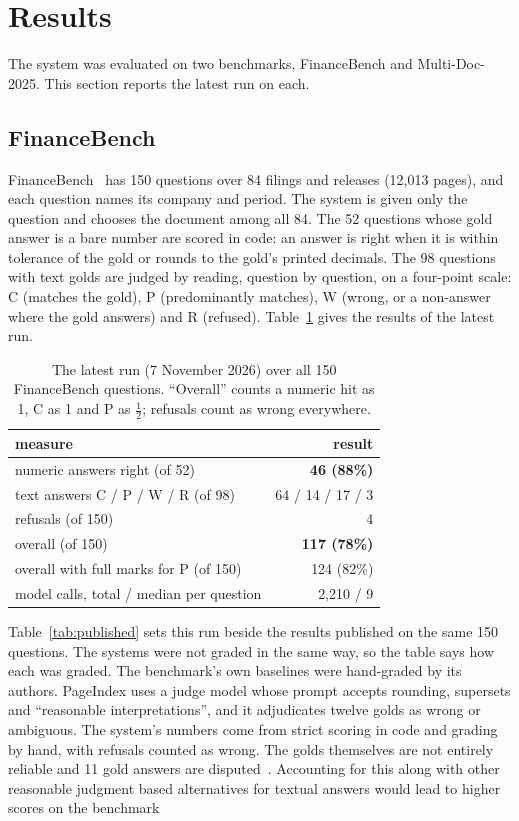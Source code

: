 \section{Results}
\label{sec:results}

The system was evaluated on two benchmarks, FinanceBench and Multi-Doc-2025. This section reports the latest run on each.

\subsection{FinanceBench}

FinanceBench~\citep{islam2023financebench} has 150 questions over 84 filings and releases (12,013 pages), and each question names its company and period. The system is given only the question and chooses the document among all 84. The 52 questions whose gold answer is a bare number are scored in code: an answer is right when it is within tolerance of the gold or rounds to the gold's printed decimals. The 98 questions with text golds are judged by reading, question by question, on a four-point scale: C (matches the gold), P (predominantly matches), W (wrong, or a non-answer where the gold answers) and R (refused). Table~\ref{tab:fb} gives the results of the latest run.

\begin{table}[h]
\centering\small
\caption{The latest run (7 November 2026) over all 150 FinanceBench questions. ``Overall'' counts a numeric hit as 1, C as 1 and P as $\tfrac12$; refusals count as wrong everywhere.}
\label{tab:fb}
\begin{tabular}{lr}
\toprule
measure & result \\
\midrule
numeric answers right (of 52) & \textbf{46 (88\%)} \\
text answers C / P / W / R (of 98) & 64 / 14 / 17 / 3 \\
refusals (of 150) & 4 \\
overall (of 150) & \textbf{117 (78\%)} \\
overall with full marks for P (of 150) & 124 (82\%) \\
model calls, total / median per question & 2,210 / 9 \\
\bottomrule
\end{tabular}
\end{table}

Table~\ref{tab:published} sets this run beside the results published on the same 150 questions. The systems were not graded in the same way, so the table says how each was graded. The benchmark's own baselines were hand-graded by its authors. PageIndex uses a judge model whose prompt accepts rounding, supersets and ``reasonable interpretations'', and it adjudicates twelve golds as wrong or ambiguous. The system's numbers come from strict scoring in code and grading by hand, with refusals counted as wrong. The golds themselves are not entirely reliable and 11 gold answers are disputed~\citep{financebench_issue7}. Accounting for this along with other reasonable judgment based alternatives for textual answers would lead to higher scores on the benchmark

